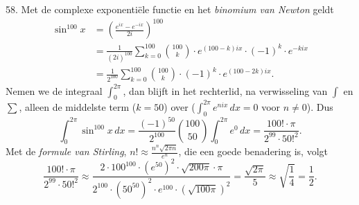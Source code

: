 \begin{problem}{58.}
	Met de complexe exponentiële functie en het \textit{binomium van Newton} geldt
    \begin{equation*}
    \begin{split}
        \sin^{100} x & = {\left( \frac{e^{i x} - e^{- i x}}{2i} \right)}^{100} \\
                     & = \frac{1}{{(2i)}^{100}} \textstyle\sum\limits_{k=0}^{100} \binom{100}{k} \cdot e^{(100 - k) i x} \cdot {(-1)}^k \cdot e^{- k i x} \\
                     & = \frac{1}{2^{100}} \textstyle\sum\limits_{k=0}^{100} \binom{100}{k} \cdot {(-1)}^k \cdot e^{(100 - 2k) i x}.
    \end{split}
    \end{equation*}
    Nemen we de integraal $\int_{0}^{2 \pi}$, dan blijft in het rechterlid, na verwisseling van $\int$ en $\sum$, alleen de middelste term ($k = 50$) over ($\int_{0}^{2 \pi} e^{n i x}\,dx = 0$ voor $n \neq 0$). Dus
    \begin{equation*}
        \int_{0}^{2 \pi} \sin^{100} x\,dx = \frac{{(-1)}^{50}}{2^{100}} \binom{100}{50} \int_{0}^{2 \pi} e^0\,dx = \frac{100! \cdot \pi}{2^{99} \cdot {50!}^2}.
    \end{equation*}
    Met de \textit{formule van Stirling}, $n! \approx \frac{n^n \sqrt{2 \pi n}}{e^n}$, die een goede benadering is, volgt
    \begin{equation*}
        \frac{100! \cdot \pi}{2^{99} \cdot {50!}^2} \approx \frac{2 \cdot {100}^{100} \cdot {\left( e^{50} \right)}^2 \cdot \sqrt{200 \pi} \cdot \pi}{2^{100} \cdot {\left( {50}^{50} \right)}^2 \cdot e^{100} \cdot {\left( \sqrt{100 \pi} \right)}^2} = \frac{\sqrt{2 \pi}}{5} \approx \sqrt{\frac{1}{4}} = \frac{1}{2}.
    \end{equation*}
\end{problem}

\clearpage

